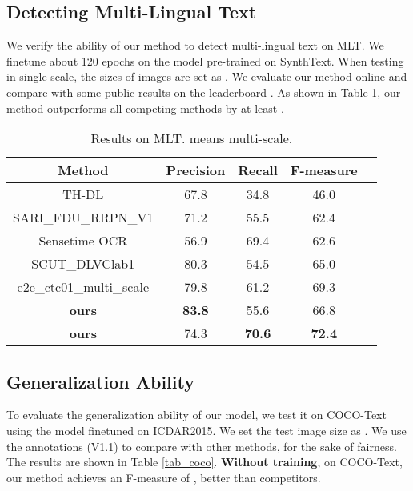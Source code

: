 \documentclass[10pt,twocolumn,letterpaper]{article}
\begin{document}
\subsection{Detecting Multi-Lingual Text}

We verify the ability of our method to detect multi-lingual text on MLT. We finetune about 120 epochs on the model pre-trained on SynthText. When testing in single scale, the sizes of images are set as  . We evaluate our method online and compare with some public results on the leaderboard \cite{MLT-Challenge}. As shown in Table \ref{tab_mlt}, our method outperforms all competing methods by at least . 

\begin{table}

\small

\begin{centering}
\begin{tabular}{|c|c|c|c|c|}
\hline 
\textbf{Method} & \textbf{Precision} & \textbf{Recall} & \textbf{F-measure}  \tabularnewline
\hline 
\hline
TH-DL \cite{MLT-Challenge} & 67.8 & 34.8 & 46.0 \tabularnewline
\hline
SARI\_FDU\_RRPN\_V1 \cite{MLT-Challenge} &71.2 & 55.5 & 62.4 \tabularnewline
\hline
Sensetime OCR \cite{MLT-Challenge} &56.9 & 69.4 & 62.6  \tabularnewline
\hline
SCUT\_DLVClab1 \cite{MLT-Challenge} &80.3  &54.5  &65.0  \tabularnewline


\hline
e2e\_ctc01\_multi\_scale \cite{MLT-Challenge} & 79.8 & 61.2 & 69.3 \tabularnewline



\hline
\textbf{ours} & \textbf{83.8} & 55.6 & 66.8  \tabularnewline
\hline
\textbf{ours} & 74.3 & \textbf{70.6} & \textbf{72.4}  \tabularnewline
\hline
\end{tabular}
\par\end{centering}
\caption{Results on MLT.  means multi-scale.}
\label{tab_mlt}
\vspace{-3mm}
\end{table}



\subsection{Generalization Ability}

To evaluate the generalization ability of our model, we test it on COCO-Text using the model finetuned on ICDAR2015. We set the test image size as . We use the annotations (V1.1) to compare with other methods, for the sake of fairness. The results are shown in Table \ref{tab_coco}. \textbf{Without training}, on COCO-Text, our method achieves an F-measure of , better than competitors.
\end{document}
